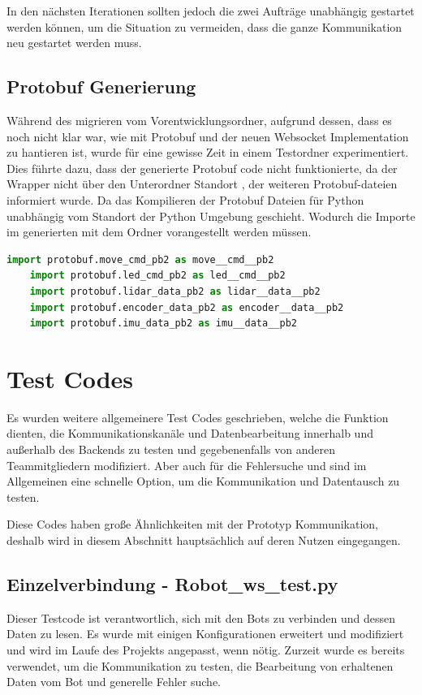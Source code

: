 In den nächsten Iterationen sollten jedoch 
die zwei Aufträge unabhängig gestartet werden können, 
um die Situation zu vermeiden, 
dass die ganze Kommunikation neu gestartet werden muss.

\subsection{Protobuf Generierung}
Während des migrieren vom Vorentwicklungsordner, 
aufgrund dessen, dass es noch nicht klar war, wie mit Protobuf 
und der neuen Websocket Implementation zu hantieren ist, 
wurde für eine gewisse Zeit in einem Testordner experimentiert.
Dies führte dazu, dass der generierte Protobuf code nicht funktionierte,
da der Wrapper nicht über den Unterordner Standort , 
der weiteren Protobuf-dateien informiert wurde.
Da das Kompilieren der Protobuf Dateien für Python unabhängig vom Standort
der Python Umgebung geschieht. 
Wodurch die Importe im generierten 
mit dem Ordner vorangestellt werden müssen.

\begin{lstlisting}[language=python, gobble=4]
    import protobuf.move_cmd_pb2 as move__cmd__pb2
    import protobuf.led_cmd_pb2 as led__cmd__pb2
    import protobuf.lidar_data_pb2 as lidar__data__pb2
    import protobuf.encoder_data_pb2 as encoder__data__pb2
    import protobuf.imu_data_pb2 as imu__data__pb2
\end{lstlisting}


\section{Test Codes}
Es wurden weitere allgemeinere Test Codes geschrieben, 
welche die Funktion dienten, die Kommunikationskanäle und Datenbearbeitung innerhalb 
und außerhalb des Backends zu testen und gegebenenfalls 
von anderen Teammitgliedern modifiziert.
% 
Aber auch für die Fehlersuche 
und sind im Allgemeinen eine schnelle Option, 
um die Kommunikation und Datentausch zu testen.

Diese Codes haben große Ähnlichkeiten mit der Prototyp Kommunikation, 
deshalb wird in diesem Abschnitt hauptsächlich auf deren Nutzen eingegangen.

\subsection{Einzelverbindung - Robot\_ws\_test.py}
Dieser Testcode ist verantwortlich, sich mit den Bots zu verbinden 
und dessen Daten zu lesen.
Es wurde mit einigen Konfigurationen erweitert und modifiziert 
und wird im Laufe des Projekts angepasst, wenn nötig.
Zurzeit wurde es bereits verwendet, um die Kommunikation zu testen, 
die Bearbeitung von erhaltenen Daten vom Bot und generelle Fehler suche.

